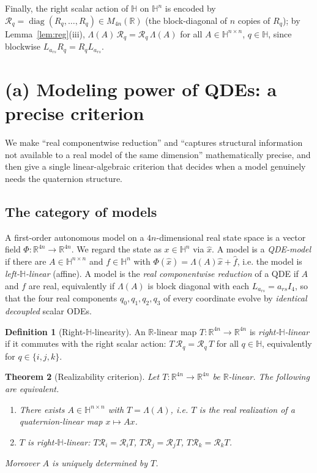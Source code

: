 \documentclass{amsart}
\newtheorem{theorem}{Theorem}
\theoremstyle{definition}
\newtheorem{definition}[theorem]{Definition}
\newcommand{\HH}{\mathbb{H}}
\newcommand{\RR}{\mathbb{R}}
\newcommand{\diag}{\operatorname{diag}}
\begin{document}
Finally, the right scalar action of $\HH$ on $\HH^n$ is encoded by
$\mathcal R_q=\diag(R_q,\dots,R_q)\in M_{4n}(\RR)$ (the block-diagonal
of $n$ copies of $R_q$); by Lemma~\ref{lem:reg}(iii),
$\Lambda(A)\,\mathcal R_q=\mathcal R_q\,\Lambda(A)$ for all
$A\in\HH^{n\times n}$, $q\in\HH$, since blockwise $L_{a_{rs}}R_q=R_qL_{a_{rs}}$.

\section{(a) Modeling power of QDEs: a precise criterion}
\label{sec:a}

We make ``real componentwise reduction'' and ``captures structural
information not available to a real model of the same dimension''
mathematically precise, and then give a single linear-algebraic
criterion that decides when a model genuinely needs the quaternion
structure.

\subsection{The category of models}
A first-order autonomous model on a $4n$-dimensional real state space is
a vector field $\Phi\colon\RR^{4n}\to\RR^{4n}$. We regard the state as
$x\in\HH^n$ via $\widehat x$. A model is a \emph{QDE-model} if there are
$A\in\HH^{n\times n}$ and $f\in\HH^n$ with
$\Phi(\widehat x)=\Lambda(A)\widehat x+\widehat f$, i.e. the model is
\emph{left-$\HH$-linear} (affine). A model is the \emph{real
componentwise reduction} of a QDE if $A$ and $f$ are real, equivalently
if $\Lambda(A)$ is block diagonal with each $L_{a_{rs}}=a_{rs}I_4$, so
that the four real components $q_0,q_1,q_2,q_3$ of every coordinate
evolve by \emph{identical decoupled} scalar ODEs.

\begin{definition}[Right-$\HH$-linearity]
\label{def:rightlin}
An $\RR$-linear map $T\colon\RR^{4n}\to\RR^{4n}$ is
\emph{right-$\HH$-linear} if it commutes with the right scalar action:
$T\,\mathcal R_q=\mathcal R_q\,T$ for all $q\in\HH$, equivalently for
$q\in\{i,j,k\}$.
\end{definition}

\begin{theorem}[Realizability criterion]
\label{thm:criterion}
Let $T\colon\RR^{4n}\to\RR^{4n}$ be $\RR$-linear. The following are
equivalent.
\begin{enumerate}
\item[\textup{(1)}] There exists $A\in\HH^{n\times n}$ with
$T=\Lambda(A)$, i.e. $T$ is the real realization of a
quaternion-linear map $x\mapsto Ax$.
\item[\textup{(2)}] $T$ is right-$\HH$-linear:
$T\mathcal R_i=\mathcal R_iT$, $T\mathcal R_j=\mathcal R_jT$,
$T\mathcal R_k=\mathcal R_kT$.
\end{enumerate}
Moreover $A$ is uniquely determined by $T$.
\end{theorem}
\end{document}
